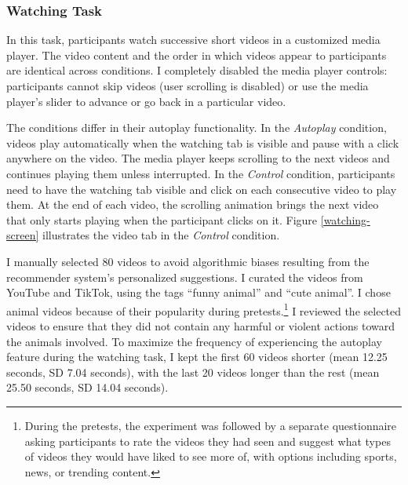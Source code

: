 \documentclass[11pt,a4paper,oneside]{article}
\begin{document}
\subsubsection{Watching Task}\label{watching-task}
In this task, participants watch successive short videos in a customized media player. The video content and the order in which videos appear to participants are identical across conditions. I completely disabled the media player controls: participants cannot skip videos (user scrolling is disabled) or use the media player's slider to advance or go back in a particular video.

The conditions differ in their autoplay functionality. In the \textit{Autoplay} condition, videos play automatically when the watching tab is visible and pause with a click anywhere on the video. The media player keeps scrolling to the next videos and continues playing them unless interrupted. In the \textit{Control} condition, participants need to have the watching tab visible and click on each consecutive video to play them. At the end of each video, the scrolling animation brings the next video that only starts playing when the participant clicks on it. Figure \ref{watching-screen} illustrates the video tab in the \textit{Control} condition.

I manually selected 80 videos to avoid algorithmic biases resulting from the recommender system's personalized suggestions. I curated the videos from YouTube and TikTok, using the tags ``funny animal'' and ``cute animal''.  I chose animal videos because of their popularity during pretests.\footnote{During the pretests, the experiment was followed by a separate questionnaire asking participants to rate the videos they had seen and suggest what types of videos they would have liked to see more of, with options including sports, news, or trending content.} I reviewed the selected videos to ensure that they did not contain any harmful or violent actions toward the animals involved. To maximize the frequency of experiencing the autoplay feature during the watching task, I kept the first 60 videos shorter (mean 12.25 seconds, SD 7.04 seconds), with the last 20 videos longer than the rest (mean 25.50 seconds, SD 14.04 seconds).
\end{document}
